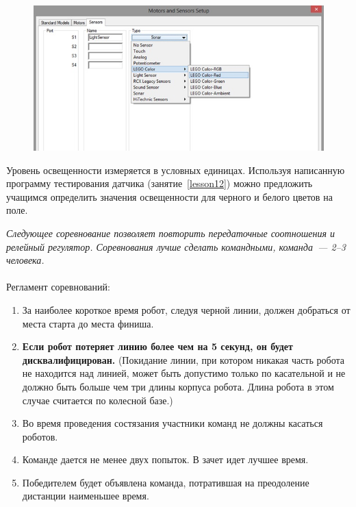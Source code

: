 \begin{figure}[h!]
	\begin{center}
		\includegraphics[width=1\linewidth]{chapters/chapter16/images/1}
		\caption{}
		\label{ris:image16x1}
	\end{center}
\end{figure}	

Уровень освещенности  измеряется в условных единицах. Используя написанную программу тестирования датчика (занятие~\ref{lesson12}) можно предложить учащимся определить значения освещенности для черного и белого цветов на поле.

{\slshape Следующее соревнование позволяет повторить передаточные соотношения и релейный регулятор. Соревнования лучше сделать командными, команда~--- 2--3 человека.}\\\\

Регламент соревнований:
\begin{enumerate}
	\item За наиболее короткое время робот, следуя черной линии, должен добраться от места старта до места финиша.
	\item {\bfseries Если робот потеряет линию более чем на 5 секунд, он будет дисквалифицирован.} (Покидание линии, при котором никакая часть робота не находится над линией, может быть допустимо только по касательной и не должно быть больше чем три длины корпуса робота. Длина робота в этом случае считается по колесной базе.)
	\item  Во время проведения состязания участники команд не должны касаться роботов.
	\item  Команде дается не менее двух попыток. В зачет идет лучшее время.
	\item  Победителем будет объявлена команда, потратившая на преодоление дистанции наименьшее время.\\\\
\end{enumerate}

